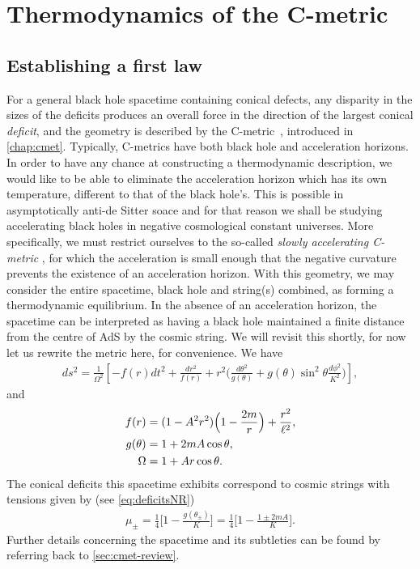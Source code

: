 \documentclass[
twoside,
openright,
frontopenright,
]{dmathesis}
\newcommand{\nn}{\nonumber}
\begin{document}
\section{Thermodynamics of the C-metric}

\subsection{Establishing a first law}

For a general black hole spacetime containing conical defects, any disparity in
the sizes of the deficits produces an overall force in the direction of the
largest conical \emph{deficit}, and the geometry is described by the
C-metric~\cite{Kinnersley:1970zw}, introduced in \cref{chap:cmet}. Typically,
C-metrics have both black hole and acceleration horizons. In order to have any
chance at constructing a thermodynamic description, we would like to be able to
eliminate the acceleration horizon which has its own temperature, different to
that of the black hole's. This is possible in asymptotically anti-de Sitter
soace and for that reason we shall be studying accelerating black holes in
negative cosmological constant universes. More specifically, we must restrict
ourselves to the so-called \emph{slowly accelerating C-metric}
\cite{Podolsky:2002nk}, for which the acceleration is small enough that the
negative curvature prevents the existence of an acceleration horizon. With this
geometry, we may consider the entire spacetime, black hole and string(s)
combined, as forming a thermodynamic equilibrium. In the absence of an
acceleration horizon, the spacetime can be interpreted as having a black hole
maintained a finite distance from the centre of AdS by the cosmic string. We
will revisit this shortly, for now let us rewrite the metric here, for
convenience. We have
\begin{align}
  ds^2=\frac{1}{\Omega^2}\left[ -
  f(r) dt^2
  +\frac{dr^2}{f(r)} + r^2 \Big( \frac{d\theta^2}{g(\theta)} 
  + g(\theta)\sin^2\theta \frac{d\phi^2}{K^2}\Big)\right],
  \label{eq:cmetric3}
\end{align}
and
\begin{align}
f(r)&=(1-A^2r^2)\Bigl(1-\frac{2 m}{r}\Bigr)
+\frac{r^2}{\ell^2},\\
  g(\theta)&=1+2mA \cos\theta,\nn\\
  \Omega&=1+Ar\cos\theta.
\label{eq:cmetric3-fun}
\end{align}
The conical deficits this spacetime exhibits correspond to cosmic strings with
tensions given by (see \cref{eq:deficitsNR})
\begin{align}
  \label{eq:tensionsNR}
  \mu_\pm=\frac14\bigg[1-\frac{g(\theta_\pm)}{K}\bigg] = \frac14\bigg[1-\frac{1\pm
  2mA}{K}\bigg]. 
\end{align} 
Further details concerning the spacetime and its subtleties can be found by
referring back to \cref{sec:cmet-review}. 
\end{document}
